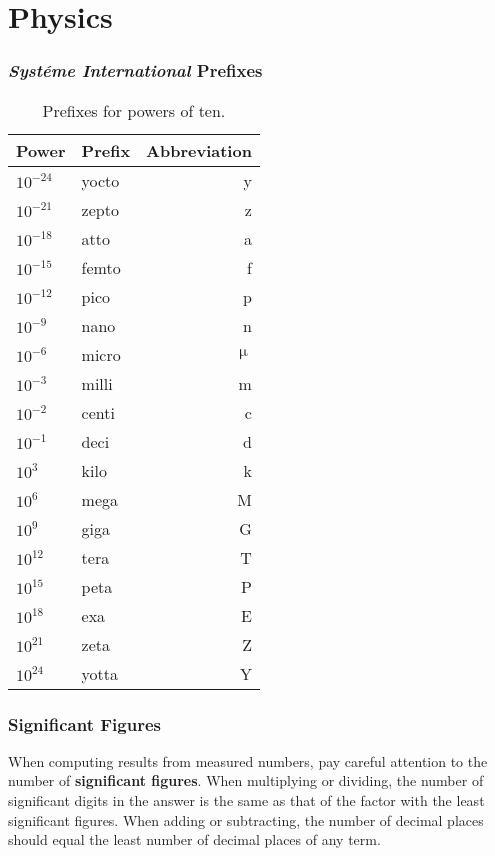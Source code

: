 \part{Physics}
\setcounter{section}{0}
\section*{\emph{Syst\'eme International} Prefixes}
\begin{table}[h]
  \centering
  \begin{tabular}{llr}
    \textbf{Power} & \textbf{Prefix} & \textbf{Abbreviation} \\ \hline
    $10^{-24}$ & yocto & y \\
    $10^{-21}$ & zepto & z \\
    $10^{-18}$ & atto & a \\
    $10^{-15}$ & femto & f \\
    $10^{-12}$ & pico & p \\
    $10^{-9}$ & nano & n \\
    $10^{-6}$ & micro & $\upmu$ \\
    $10^{-3}$ & milli & m \\
    $10^{-2}$ & centi & c \\
    $10^{-1}$ & deci & d \\
    $10^{3}$ & kilo & k \\
    $10^{6}$ & mega & M \\
    $10^{9}$ & giga & G \\
    $10^{12}$ & tera & T \\
    $10^{15}$ & peta & P \\
    $10^{18}$ & exa & E \\
    $10^{21}$ & zeta & Z \\
    $10^{24}$ & yotta & Y \\ \hline
  \end{tabular}
  \caption{Prefixes for powers of ten.}
  \label{tab:si_prefixes}
\end{table}

\section*{Significant Figures}

When computing results from measured numbers, pay careful attention to the
number of \textbf{significant figures}. When
multiplying or dividing, the number of significant digits in the answer is the
same as that of the factor with the least significant figures. When adding or
subtracting, the number of decimal places should equal the least number of
decimal places of any term.

